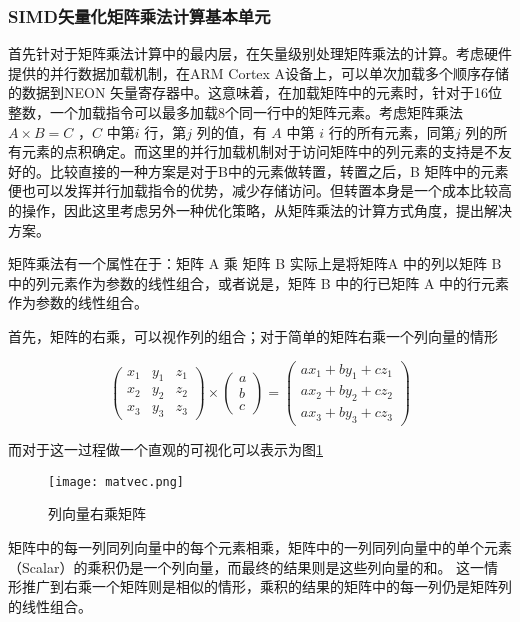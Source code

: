 \subsubsection{SIMD矢量化矩阵乘法计算基本单元}
\label{sec:linear-matmul}

首先针对于矩阵乘法计算中的最内层，在矢量级别处理矩阵乘法的计算。考虑硬件提供的并行数据加载机制，在ARM Cortex A设备上，可以单次加载多个顺序存储的数据到NEON 矢量寄存器中。这意味着，在加载矩阵中的元素时，针对于16位整数，一个加载指令可以最多加载8个同一行中的矩阵元素。考虑矩阵乘法 $A \times B = C$ ，$ C$ 中第$ i$ 行，第$j$ 列的值，有 $A$ 中第 $i$ 行的所有元素，同第$j$ 列的所有元素的点积确定。而这里的并行加载机制对于访问矩阵中的列元素的支持是不友好的。比较直接的一种方案是对于B中的元素做转置，转置之后，B 矩阵中的元素便也可以发挥并行加载指令的优势，减少存储访问。但转置本身是一个成本比较高的操作，因此这里考虑另外一种优化策略，从矩阵乘法的计算方式角度，提出解决方案。

矩阵乘法有一个属性在于：矩阵 A 乘 矩阵 B 实际上是将矩阵A 中的列以矩阵 B 中的列元素作为参数的线性组合，或者说是，矩阵 B 中的行已矩阵 A 中的行元素作为参数的线性组合。

首先，矩阵的右乘，可以视作列的组合；对于简单的矩阵右乘一个列向量的情形

\begin{equation}
  \begin{pmatrix}
    x_1 & y_1 & z_1\\
    x_2 & y_2 & z_2\\  
    x_3 & y_3 & z_3
  \end{pmatrix}
  \times 
  \begin{pmatrix}
    a \\
    b \\
    c
  \end{pmatrix}
  = 
  \begin{pmatrix}
    ax_1 + by_1 + cz_1\\
    ax_2 + by_2 + cz_2\\  
    ax_3 + by_3 + cz_3
  \end{pmatrix}
\end{equation}

而对于这一过程做一个直观的可视化可以表示为图\ref{fig:matvec}

\begin{figure}
\centering
\texttt{[image: matvec.png]}
\caption{列向量右乘矩阵}
\label{fig:matvec}
\end{figure}

矩阵中的每一列同列向量中的每个元素相乘，矩阵中的一列同列向量中的单个元素（Scalar）的乘积仍是一个列向量，而最终的结果则是这些列向量的和。
这一情形推广到右乘一个矩阵则是相似的情形，乘积的结果的矩阵中的每一列仍是矩阵列的线性组合。


